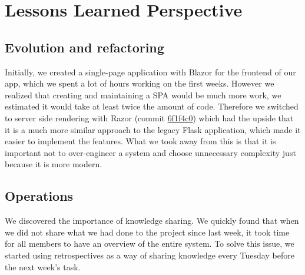 \newpage
\section{Lessons Learned Perspective}






\subsection{Evolution and refactoring} \label{evoref}
Initially, we created a single-page application with Blazor for the frontend of our app, which we spent a lot of hours working on the first weeks. However we realized that creating and maintaining a SPA would be much more work, we estimated it would take at least twice the amount of code. Therefore we switched to server side rendering with Razor (commit \href{https://github.com/NiclasHjortkjaer/itu-minitwit/commit/6f1f4c0fde3a84cd562ba9b5271dc39a572e10c9}{6f1f4c0}) which had the upside that it is a much more similar approach to the legacy Flask application, which made it easier to implement the features. What we took away from this is that it is important not to over-engineer a system and choose unnecessary complexity just because it is more modern.

\subsection{Operations}
We discovered the importance of knowledge sharing. We quickly found that when we did not share what we had done to the project since last week, it took time for all members to have an overview of the entire system. To solve this issue, we started using retrospectives as a way of sharing knowledge every Tuesday before the next week's task.

